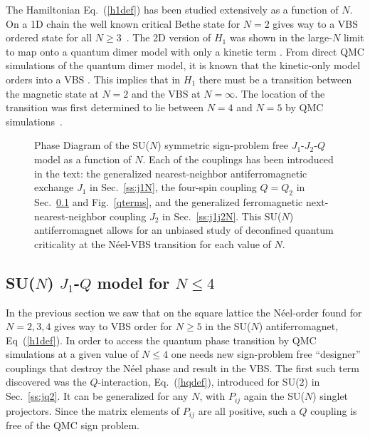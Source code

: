 \documentclass[range]{ar2e}
\begin{document}
The Hamiltonian Eq.~(\ref{h1def}) has been studied extensively as a function of $N$. On a 1D chain the well known critical Bethe state for $N=2$ gives way to a 
VBS ordered state for all $N\geq 3$~\cite{barber1989:d1n3_vbs,klumper1989:d1n3_vbs,affleck1985:lgN}. The 2D version of $H_{1}$ was shown 
in the large-$N$ limit to map onto a quantum dimer model with only a kinetic term \cite{read1989:nucphysB}. From direct QMC simulations of the quantum dimer model, 
it is known that the kinetic-only model orders into a VBS \cite{sachdev1989:qd_vbs}.  This implies that in $H_{1}$ there must be a transition between the 
magnetic state at $N=2$ and the VBS at $N=\infty$.  The location of the transition was first determined to lie between $N=4$ and $N=5$ 
by QMC simulations~\cite{harada2003:sun}.

\begin{figure}
\centerline{}
  \caption{ \label{fig:pdj1j2q} Phase Diagram of the SU($N$) symmetric sign-problem free
    $J_1$-$J_2$-$Q$ model as a function of $N$. Each of the couplings has been introduced
    in the text: the generalized nearest-neighbor antiferromagnetic exchange $J_1$ in Sec.~\ref{ss:j1N}, the four-spin coupling $Q=Q_2$ in 
    Sec.~\ref{ss:jqN} and Fig.~\ref{qterms}, and the generalized ferromagnetic next-nearest-neighbor coupling $J_2$ in Sec.~\ref{ss:j1j2N}. 
    This SU($N$) antiferromagnet allows for an unbiased study of deconfined quantum
    criticality at the N\'eel-VBS transition for each value of $N$. }
\end{figure}


\subsection{SU($N$) $J_1$-$Q$ model for $N\leq 4$}
\label{ss:jqN}

In the previous section we saw that on the square lattice the N\'eel-order found for $N=2,3,4$ gives way to VBS
order for $N\geq 5$ in the SU($N$) antiferromagnet, Eq~(\ref{h1def}). In order to access the quantum phase transition by QMC simulations at a 
given value of $N\leq 4$ one needs new sign-problem free ``designer'' couplings that destroy the N\'eel phase and result in the VBS. The first such term discovered 
was the $Q$-interaction, Eq.~(\ref{hqdef}), introduced for SU($2$) in Sec.~\ref{ss:jq2}. It can be generalized for any $N$, with $P_{ij}$ again 
the SU($N$) singlet projectors. Since the matrix elements of $P_{ij}$ are all positive, such a $Q$ coupling is free of the QMC sign problem. 
\end{document}
